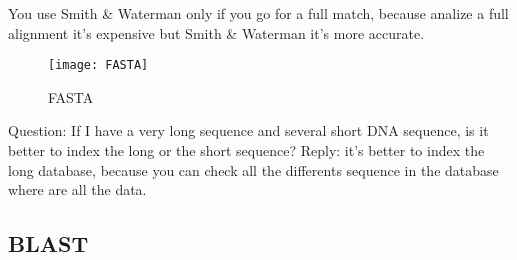 You use Smith \& Waterman only if you go for a full match, because analize a
full alignment it's expensive but Smith \& Waterman it's more accurate.

\begin{figure}[H]
  \centering
  \texttt{[image: FASTA]}
  \caption{FASTA}
\end{figure}

Question: If I have a very long sequence and several short DNA sequence, is it
better to index the long or the short sequence? Reply: it's better to index
the long database, because you can check all the differents sequence in the
database where are all the data.

\subsection{BLAST}
